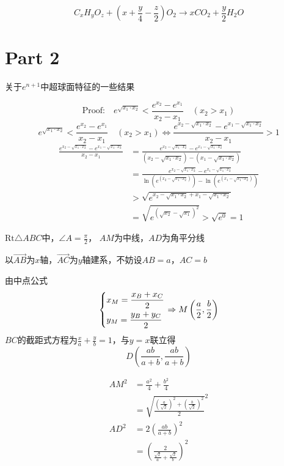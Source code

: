 \documentclass[UTF8]{article}
\begin{document}
$$
{C_xH_yO_z +(x +\frac y4-\frac z2)O_2\rightarrow xCO_2+\frac y2H_2O}
$$


\section{Part 2}
关于$e^{n+1}$中超球面特征的一些结果 \cite{Wen}

$$
\text{Proof:}\quad{e^{\sqrt {{x_1} \cdot {x_2}} }} < \frac{{{e^{{x_2}}} - {e^{{x_1}}}}}{{{x_2} - {x_1}}}
\quad({x_2} > {x_1})$$
$$
{e^{\sqrt {{x_1} \cdot {x_2}} }} < \frac{{{e^{{x_2}}} - {e^{{x_1}}}}}{{{x_2} - {x_1}}}
\quad({x_2} > {x_1})
\Leftrightarrow 
\frac{{{e^{{x_2} - \sqrt {{x_1} \cdot {x_2}} }} - {e^{{x_1} - \sqrt {{x_1} \cdot {x_2}} }}}}{{{x_2} - {x_1}}} > 1
$$
$$\begin{aligned}
\frac{{{e^{{x_2} - \sqrt {{x_1} \cdot {x_2}} }} - {e^{{x_1} - \sqrt {{x_1} \cdot {x_2}} }}}}{{{x_2} - {x_1}}}&=\frac{{{e^{{x_2} - \sqrt {{x_1} \cdot {x_2}} }} - {e^{{x_1} - \sqrt {{x_1} \cdot {x_2}} }}}}{{({x_2} - \sqrt {{x_1} \cdot {x_2}} ) - ({x_1} - \sqrt {{x_1} \cdot {x_2}} )}}\\
&=\frac{{{e^{{x_2} - \sqrt {{x_1} \cdot {x_2}} }} - {e^{{x_1} - \sqrt {{x_1} \cdot {x_2}} }}}}{{\ln ({e^{({x_2} - \sqrt {{x_1} \cdot {x_2}} )}}) - \ln ({e^{({x_1} - \sqrt {{x_1} \cdot {x_2}} )}})}}\\
&>\sqrt {{e^{{x_2} - \sqrt {{x_1} \cdot {x_2}}  + {x_1} - \sqrt {{x_1} \cdot {x_2}} }}}\\
&=\sqrt {{e^{{{(\sqrt {{x_2}}  - \sqrt {{x_1}} )}^2}}}}>\sqrt {e^0}=1
\end{aligned}
$$

$\text{Rt}\triangle ABC$中，$\angle A=\frac\pi2$， $AM$为中线，$AD$为角平分线

以$\vec{AB}$为$x$轴，$\vec{AC}$为$y$轴建系，不妨设$AB=a$，$AC=b$

由中点公式
$$
\left\{ \begin{gathered}
  {x_M} = \frac{{{x_B} + {x_C}}}{2} \hfill \\
  {y_M} = \frac{{{y_B} + {y_C}}}{2} \hfill \\\end{gathered}  \right.\Rightarrow M\left( {\frac{a}{2},\frac{b}{2}} \right)
$$
$ BC$的截距式方程为$\frac{x}{a} + \frac{y}{b} = 1$，与$y=x$联立得
$$
D\left( {\frac{{ab}}{{a + b}},\frac{{ab}}{{a + b}}} \right)
$$

$$
\begin{aligned}
 A{M^2} &= \frac{{{a^2}}}{4} + \frac{{{b^2}}}{4}\\
	&={\sqrt {\frac{{{{\left( {\frac{a}{{\sqrt 2 }}} \right)}^2} + {{\left( {\frac{b}{{\sqrt 2 }}} \right)}^2}}}{2}} ^2}
\\AD^2&=2{\left( {\frac{{ab}}{{a + b}}} \right)^2}\\
&= {\left( {\frac{2}{{\frac{{\sqrt 2 }}{a} + \frac{{\sqrt 2 }}{b}}}} \right)^2}
\end{aligned}
$$
\end{document}
